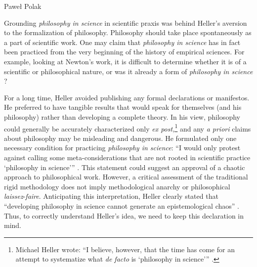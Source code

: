 \begin{artengenv}{Paweł Polak}

Grounding \textit{philosophy in science} in scientific praxis was behind Heller’s aversion to the formalization of
philosophy. Philosophy should take place spontaneously as a part of scientific work. One may claim that
\textit{philosophy in science }has in fact been practiced from the very beginning of the history of empirical sciences.
For example, looking at Newton’s work, it is difficult to determine whether it is of a scientific or philosophical
nature, or was it already a form of \textit{philosophy in science}
\parencite[p.\pageref{heller-newton}]{pol_heller_how_2019}?

For a long time, Heller avoided publishing any formal declarations or manifestos. He preferred to have tangible results
that would speak for themselves (and his philosophy) rather than developing a complete theory. In his view, philosophy
could generally be accurately characterized only \textit{ex post,}\footnote{Michael Heller wrote: ``I believe, however,
that the time has come for an attempt to systematize what \textit{de facto} is ‘philosophy in science’''
\parencite[p.\pageref{heller-defacto}]{pol_heller_how_2019}.
} and any \textit{a priori} claims about philosophy may be misleading and dangerous. He formulated only one
necessary condition for practicing \textit{philosophy in science}: ``I would only protest against calling some
meta-considerations that are not rooted in scientific practice ‘philosophy in science’''
\parencite[p.\pageref{heller-not-rooted}]{pol_heller_how_2019}.
This
statement
could suggest an approval of a chaotic approach to philosophical work. However, a critical
assessment of the traditional rigid methodology does not imply methodological anarchy or philosophical
\emph{laissez}-\emph{faire}. Anticipating this interpretation, Heller clearly stated that ``developing
philosophy in science cannot generate an epistemological chaos''
\parencite[p.8]{pol_heller_introduction_1983}.
Thus, to
correctly understand Heller’s idea, we need to keep this declaration in mind.


\end{artengenv}
